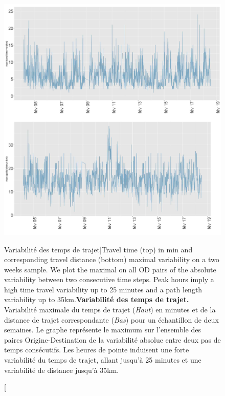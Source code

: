\begin{figure}
\includegraphics[width=\linewidth]{Figures/Final/8-1-2-fig-transportationequilibrium-fig-3.jpg}
\caption[Variability of travel time and distance][Variabilité des temps de trajet]{Travel time (top) in min and corresponding travel distance (bottom) maximal variability on a two weeks sample. We plot the maximal on all OD pairs of the absolute variability between two consecutive time steps. Peak hours imply a high time travel variability up to 25 minutes and a path length variability up to 35km.\label{fig:transportationequilibrium:fig-3}}{\textbf{Variabilité des temps de trajet.} Variabilité maximale du temps de trajet (\textit{Haut}) en minutes et de la distance de trajet correspondante (\textit{Bas}) pour un échantillon de deux semaines. Le graphe représente le maximum sur l'ensemble des paires Origine-Destination de la variabilité absolue entre deux pas de temps consécutifs. Les heures de pointe induisent une forte variabilité du temps de trajet, allant jusqu'à 25 minutes et une variabilité de distance jusqu'à 35km.\label{fig:transportationequilibrium:fig-3}}
\end{figure}




